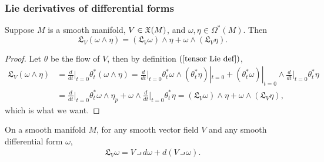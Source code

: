 \subsubsection{Lie derivatives of differential forms}
\begin{proposition}\label{wedge Lie der}
Suppose $M$ is a smooth manifold, $V\in\mathfrak{X}(M)$, and $\omega,\eta\in\Omega^*(M)$. Then
\[\mathfrak{L}_V(\omega\wedge\eta)=(\mathfrak{L}_V\omega)\wedge\eta+\omega\wedge(\mathfrak{L}_V\eta).\]
\end{proposition}
\begin{proof}
Let $\theta$ be the flow of $V$, then by definition $(\ref{tensor Lie def})$,
\begin{align*}
\mathfrak{L}_V(\omega\wedge\eta)&=\frac{d}{dt}\Big|_{t=0}\theta_t^*(\omega\wedge\eta)=\frac{d}{dt}\Big|_{t=0}\theta_t^*\omega\wedge(\theta_t^*\eta)|_{t=0}+(\theta_t^*\omega)|_{t=0}\wedge\frac{d}{dt}\Big|_{t=0}\theta_t^*\eta\\
&=\frac{d}{dt}\Big|_{t=0}\theta_t^*\omega\wedge\eta_p+\omega\wedge\frac{d}{dt}\Big|_{t=0}\theta_t^*\eta=(\mathfrak{L}_V\omega)\wedge\eta+\omega\wedge(\mathfrak{L}_V\eta),
\end{align*}
which is what we want.
\end{proof}
\begin{proposition}
On a smooth manifold $M$, for any smooth vector field $V$ and any smooth differential form $\omega$,
\begin{align}\label{Cartan magic}
\mathfrak{L}_V\omega=V\intprod d\omega+d(V\intprod\omega).
\end{align}
\end{proposition}
